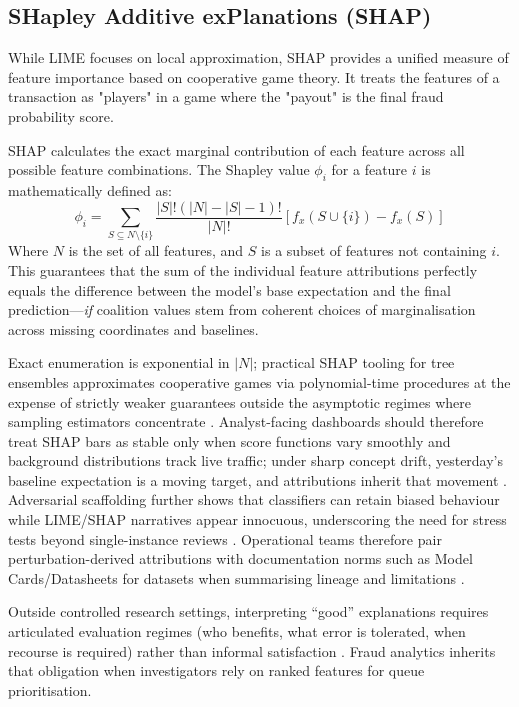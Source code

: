 \subsection{SHapley Additive exPlanations (SHAP)}
While LIME focuses on local approximation, SHAP provides a unified measure of feature importance based on cooperative game theory. It treats the features of a transaction as "players" in a game where the "payout" is the final fraud probability score. 

SHAP calculates the exact marginal contribution of each feature across all possible feature combinations. The Shapley value $\phi_i$ for a feature $i$ is mathematically defined as:
\begin{equation}
\phi_i = \sum_{S \subseteq N \setminus \{i\}} \frac{|S|! (|N| - |S| - 1)!}{|N|!} \left[ f_x(S \cup \{i\}) - f_x(S) \right]
\end{equation}
Where $N$ is the set of all features, and $S$ is a subset of features not containing $i$. This guarantees that the sum of the individual feature attributions perfectly equals the difference between the model's base expectation and the final prediction—\emph{if} coalition values stem from coherent choices of marginalisation across missing coordinates and baselines.

Exact enumeration is exponential in $|N|$; practical SHAP tooling for tree ensembles approximates cooperative games via polynomial-time procedures at the expense of strictly weaker guarantees outside the asymptotic regimes where sampling estimators concentrate \cite{shap_original}. Analyst-facing dashboards should therefore treat SHAP bars as stable only when score functions vary smoothly and background distributions track live traffic; under sharp concept drift, yesterday's baseline expectation is a moving target, and attributions inherit that movement \cite{lucas_jurgovsky_ccfraud_survey2020,xai_survey}. Adversarial scaffolding further shows that classifiers can retain biased behaviour while LIME/SHAP narratives appear innocuous, underscoring the need for stress tests beyond single-instance reviews \cite{slack2020_fooling_lime_shap}. Operational teams therefore pair perturbation-derived attributions with documentation norms such as Model Cards/Datasheets for datasets when summarising lineage and limitations \cite{mitchell2019model_cards,gebru2021datasheets}.

Outside controlled research settings, interpreting ``good'' explanations requires articulated evaluation regimes (who benefits, what error is tolerated, when recourse is required) rather than informal satisfaction \cite{doshi_velez_kim_interpretability_2017}. Fraud analytics inherits that obligation when investigators rely on ranked features for queue prioritisation.

